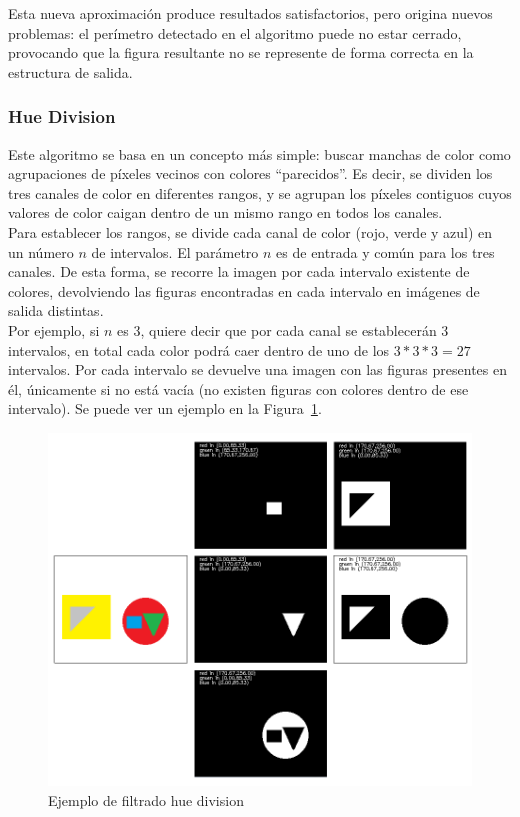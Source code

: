 {	Esta nueva aproximación produce resultados satisfactorios, pero origina nuevos problemas: el perímetro detectado en el algoritmo puede no estar cerrado, provocando que la figura resultante no se represente de forma correcta en la estructura de salida.
	
	\subsubsection{Hue Division}
	
	Este algoritmo se basa en un concepto más simple: buscar manchas de color como agrupaciones de píxeles vecinos con colores ``parecidos''. Es decir, se dividen los tres canales de color en diferentes rangos, y se agrupan los píxeles contiguos cuyos valores de color caigan dentro de un mismo rango en todos los canales.\\
	
	Para establecer los rangos, se divide cada canal de color (rojo, verde y azul) en un número $n$ de intervalos. El parámetro $n$ es de entrada y común para los tres canales. De esta forma, se recorre la imagen por cada intervalo existente de colores, devolviendo las figuras encontradas en cada intervalo en imágenes de salida distintas.\\
	
	Por ejemplo, si $n$ es 3, quiere decir que por cada canal se establecerán 3 intervalos, en total cada color podrá caer dentro de uno de los $3*3*3=27$ intervalos. Por cada intervalo se devuelve una imagen con las figuras presentes en él, únicamente si no está vacía (no existen figuras con colores dentro de ese intervalo). Se puede ver un ejemplo en la Figura~\ref{fig:canny}.
	
		\begin{figure}[htbp]
		\centering
		\includegraphics[scale=0.47]{graphics/huedivision.png}
		\caption{Ejemplo de filtrado hue division}
		\label{fig:canny}
		\end{figure}
	
}
